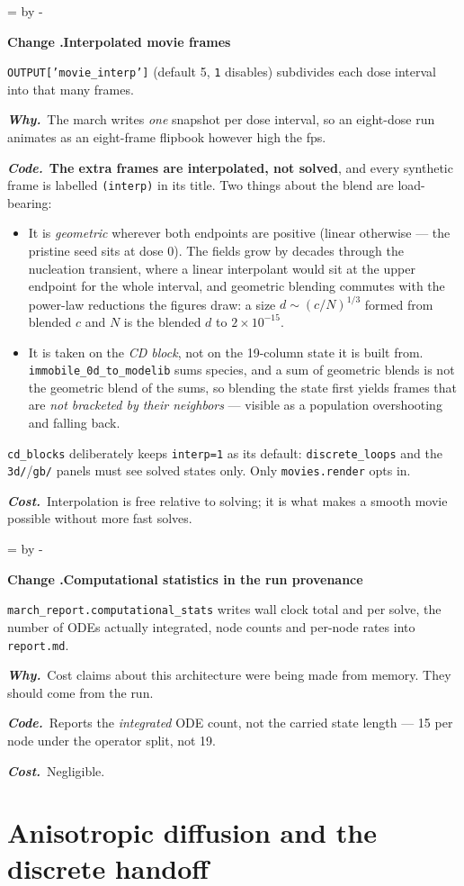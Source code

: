 \documentclass[11pt,a4paper]{article}
\newcommand{\code}[1]{\texttt{\small #1}}
\newcommand{\needlines}[1]{%
  \par\dimen0=\pagegoal \advance\dimen0 by -\pagetotal
  \ifdim\dimen0<#1\baselineskip \newpage \fi}
\newcounter{chg}
\newcommand{\change}[1]{%
  \needlines{4}%
  \refstepcounter{chg}%
  \par\medskip\noindent
  {\bfseries\boldmath Change \thechg.\quad #1}%
  \par\nobreak\smallskip}
\newcommand{\why}[1]{\par\noindent\textbf{\itshape Why.}\ #1\par}
\newcommand{\impact}[1]{\par\noindent\textbf{\itshape Code.}\ #1\par}
\newcommand{\cost}[1]{\par\noindent\textbf{\itshape Cost.}\ #1\par}
\begin{document}
\change{Interpolated movie frames}
\label{chg:movies}
\code{OUTPUT['movie\_interp']} (default 5, \code{1} disables) subdivides each
dose interval into that many frames.
\why{The march writes \emph{one} snapshot per dose interval, so an eight-dose
run animates as an eight-frame flipbook however high the fps.}
\impact{\textbf{The extra frames are interpolated, not solved}, and every
synthetic frame is labelled \code{(interp)} in its title. Two things about the
blend are load-bearing:

\begin{itemize}\itemsep2pt
\item It is \emph{geometric} wherever both endpoints are positive (linear
  otherwise --- the pristine seed sits at dose 0). The fields grow by decades
  through the nucleation transient, where a linear interpolant would sit at the
  upper endpoint for the whole interval, and geometric blending commutes with
  the power-law reductions the figures draw: a size $d \sim (c/N)^{1/3}$ formed
  from blended $c$ and $N$ is the blended $d$ to $2\times10^{-15}$.
\item It is taken on the \emph{CD block}, not on the 19-column state it is
  built from. \code{immobile\_0d\_to\_modelib} sums species, and a sum of
  geometric blends is not the geometric blend of the sums, so blending the
  state first yields frames that are \emph{not bracketed by their neighbors}
  --- visible as a population overshooting and falling back.
\end{itemize}

\noindent
\code{cd\_blocks} deliberately keeps \code{interp=1} as its default:
\code{discrete\_loops} and the \code{3d/}/\code{gb/} panels must see solved
states only. Only \code{movies.render} opts in.}
\cost{Interpolation is free relative to solving; it is what makes a smooth
movie possible without more fast solves.}

\change{Computational statistics in the run provenance}
\label{chg:stats}
\code{march\_report.computational\_stats} writes wall clock total and per
solve, the number of ODEs actually integrated, node counts and per-node rates
into \code{report.md}.
\why{Cost claims about this architecture were being made from memory. They
should come from the run.}
\impact{Reports the \emph{integrated} ODE count, not the carried state length
--- 15 per node under the operator split, not 19.}
\cost{Negligible.}

\part{Anisotropic diffusion and the discrete handoff}
\label{part:aniso}
\end{document}
